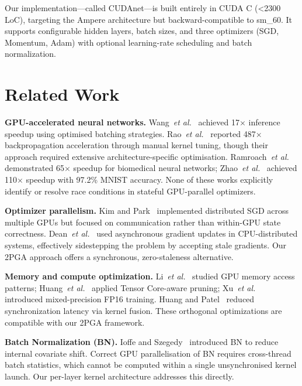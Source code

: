 \documentclass[conference]{IEEEtran}
\begin{document}
Our implementation—called CUDAnet—is built entirely in CUDA C (\textless 2300\,LoC), targeting the Ampere architecture but backward-compatible to sm\_60. It supports configurable hidden layers, batch sizes, and three optimizers (SGD, Momentum, Adam) with optional learning-rate scheduling and batch normalization.

\section{Related Work}

\textbf{GPU-accelerated neural networks.} Wang~\textit{et al.}~\cite{b4} achieved 17$\times$ inference speedup using optimised batching strategies. Rao~\textit{et al.}~\cite{b5} reported 487$\times$ backpropagation acceleration through manual kernel tuning, though their approach required extensive architecture-specific optimisation. Ramroach~\textit{et al.}~\cite{b6} demonstrated 65$\times$ speedup for biomedical neural networks; Zhao~\textit{et al.}~\cite{b14} achieved 110$\times$ speedup with 97.2\% MNIST accuracy. None of these works explicitly identify or resolve race conditions in stateful GPU-parallel optimizers.

\textbf{Optimizer parallelism.} Kim and Park~\cite{b13} implemented distributed SGD across multiple GPUs but focused on communication rather than within-GPU state correctness. Dean~\textit{et al.}~\cite{b10} used asynchronous gradient updates in CPU-distributed systems, effectively sidestepping the problem by accepting stale gradients. Our 2PGA approach offers a synchronous, zero-staleness alternative.

\textbf{Memory and compute optimization.} Li~\textit{et al.}~\cite{b12} studied GPU memory access patterns; Huang~\textit{et al.}~\cite{b11} applied Tensor Core-aware pruning; Xu~\textit{et al.}~\cite{b15} introduced mixed-precision FP16 training. Huang and Patel~\cite{b17} reduced synchronization latency via kernel fusion. These orthogonal optimizations are compatible with our 2PGA framework.

\textbf{Batch Normalization (BN).} Ioffe and Szegedy~\cite{b8} introduced BN to reduce internal covariate shift. Correct GPU parallelisation of BN requires cross-thread batch statistics, which cannot be computed within a single unsynchronised kernel launch. Our per-layer kernel architecture addresses this directly.
\end{document}
